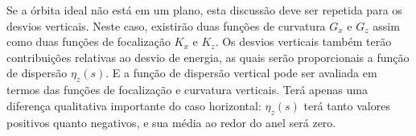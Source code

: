Se a órbita ideal não está em um plano, esta discussão deve ser repetida para os desvios verticais. Neste caso, existirão duas funções de curvatura $G_x$ e $G_z$ assim como duas funções de focalização $K_x$ e $K_z$. Os desvios verticais também terão contribuições relativas ao desvio de energia, as quais serão proporcionais a função de dispersão $\eta_z(s)$. E a função de dispersão vertical pode ser avaliada em termos das funções de focalização e curvatura verticais. Terá apenas uma diferença qualitativa importante do caso horizontal: $\eta_z(s)$ terá tanto valores positivos quanto negativos, e sua média ao redor do anel será zero.